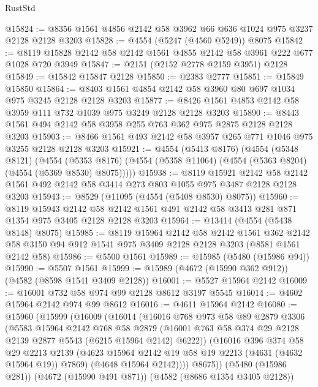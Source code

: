 \begin{lexlean}{RustStd}
\begin{coremodule}
{\begin{coremodule}
{{{{{{{{{{{{{{{{@15824 := @8356 @1561 @4856 @2142 @58 @3962 @66 @636 @1024 @975 @3237 @2128 @2128 @3203
@15828 := @4554 (@5247 (@4560 @5249)) @8075
@15842 := @8119 @15828 @2142 @58 @2142 @1561 @4855 @2142 @58 @3961 @222 @677 @1028 @720 @3949
@15847 := @2151 (@2152 @2778 @2159 @3951) @2128
@15849 := @15842 @15847 @2128
@15850 := @2383 @2777
@15851 := @15849 @15850
@15864 := @8403 @1561 @4854 @2142 @58 @3960 @80 @697 @1034 @975 @3245 @2128 @2128 @3203
@15877 := @8426 @1561 @4853 @2142 @58 @3959 @111 @732 @1039 @975 @3249 @2128 @2128 @3203
@15890 := @8443 @1561 @494 @2142 @58 @3958 @255 @763 @362 @975 @2875 @2128 @2128 @3203
@15903 := @8466 @1561 @493 @2142 @58 @3957 @265 @771 @1046 @975 @3255 @2128 @2128 @3203
@15921 := @4554
    (@5413 @8176)
    (@4554
      (@5348 @8121)
      (@4554
        (@5353 @8176)
        (@4554 (@5358 @11064) (@4554 (@5363 @8204) (@4554 (@5369 @8530) @8075)))))
@15938 := @8119
    @15921
    @2142
    @58
    @2142
    @1561
    @492
    @2142
    @58
    @3414
    @273
    @803
    @1055
    @975
    @3487
    @2128
    @2128
    @3203
@15943 := @8529 (@11095 (@4554 (@5408 @8530) @8075))
@15960 := @8119
    @15943
    @2142
    @58
    @2142
    @1561
    @491
    @2142
    @58
    @3413
    @281
    @871
    @1354
    @975
    @3405
    @2128
    @2128
    @3203
@15964 := @13414 (@4554 (@5438 @8148) @8075)
@15985 := @8119
    @15964
    @2142
    @58
    @2142
    @1561
    @362
    @2142
    @58
    @3150
    @94
    @912
    @1541
    @975
    @3409
    @2128
    @2128
    @3203
    (@8581 @1561 @2142 @58)
@15986 := @5500 @1561
@15989 := @15985 (@5480 (@15986 @94))
@15990 := @5507 @1561
@15999 := @15989 (@4672 (@15990 @362 @912)) (@4582 (@8598 @1541 @3409 @2128))
@16001 := @5527 @15964 @2142
@16009 := @16001 @732 @58 @974 @99 @2128 @8612 @3197 @5545
@16014 := @4602 @15964 @2142 @974 @99 @8612
@16016 := @4611 @15964 @2142
@16080 := @15960
    (@15999
      (@16009
        (@16014
          (@16016
            @768
            @973
            @58
            @89
            @2879
            @3306
            (@5583
              @15964
              @2142
              @768
              @58
              @2879
              (@16001 @763 @58 @374 @29 @2128 @2139 @2877 @5543 (@6215 @15964 @2142) @6222))
            (@16016
              @396
              @374
              @58
              @29
              @2213
              @2139
              (@4623 @15964 @2142 @19 @58 @19 @2213 (@4631 (@4632 @15964 @19)) @7869)
              (@4648 @15964 @2142))))
        @8675))
    (@5480 (@15986 @281))
    (@4672 (@15990 @491 @871))
    (@4582 (@8686 @1354 @3405 @2128))
}}}}}}}}}}}}}}}}
\end{coremodule}}
\end{coremodule}
\end{lexlean}
